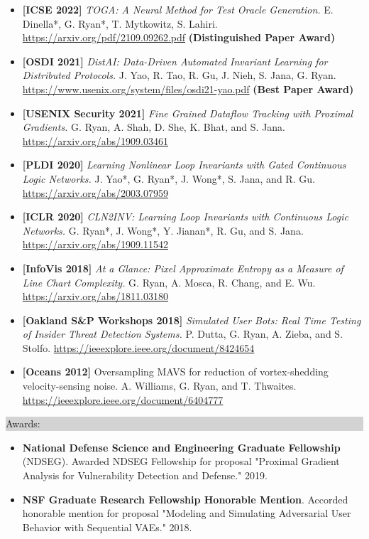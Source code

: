 \documentclass{article} %
\newcommand{\rsection}[1]{
  \hspace{-0.4cm}\vspace{0.1cm}
\colorbox{lightgrey}{
\begin{minipage}{1.07\linewidth}
\vspace{0.22cm}
\fontsize{14pt}{16pt}\selectfont #1
\vspace{0.12cm}
\end{minipage}
}
\vspace*{-0.1cm}
}
\begin{document}
\begin{minipage}{1.01\linewidth}
\begin{itemize}[label={},itemindent=-2em,leftmargin=2em, parsep=5pt]
  \item {\bf [ICSE 2022]}
    \textit{TOGA: A Neural Method for Test Oracle Generation.}
    E. Dinella*, G. Ryan*, T. Mytkowitz, S. Lahiri. \url{https://arxiv.org/pdf/2109.09262.pdf} \textbf{(Distinguished Paper Award)}
  \item {\bf [OSDI 2021]}
    \textit{DistAI: Data-Driven Automated Invariant Learning for Distributed Protocols.}
    J. Yao, R. Tao, R. Gu, J. Nieh, S. Jana, G. Ryan. \url{https://www.usenix.org/system/files/osdi21-yao.pdf} \textbf{(Best Paper Award)}
  \item {\bf [USENIX Security 2021]}
    \textit{Fine Grained Dataflow Tracking with Proximal Gradients.}
    G. Ryan, A. Shah, D. She, K. Bhat, and S. Jana. \url{https://arxiv.org/abs/1909.03461}
  \item {\bf [PLDI 2020]}
    \textit{Learning Nonlinear Loop Invariants with Gated Continuous Logic Networks.}
    J. Yao*, G. Ryan*, J. Wong*, S. Jana, and R. Gu. \url{https://arxiv.org/abs/2003.07959}
  \item {\bf [ICLR 2020]}
    \textit{CLN2INV: Learning Loop Invariants with Continuous Logic Networks.}
    G. Ryan*, J. Wong*, Y. Jianan*, R. Gu, and S. Jana. \url{https://arxiv.org/abs/1909.11542}
  \item {\bf [InfoVis 2018]}
    \textit{At a Glance: Pixel Approximate Entropy as a Measure of Line Chart Complexity.}
    G. Ryan, A. Mosca, R. Chang, and E. Wu. \url{https://arxiv.org/abs/1811.03180}
  \item  {\bf [Oakland S\&P Workshops 2018]}
    \textit{Simulated User Bots: Real Time Testing of Insider Threat Detection Systems.}
    P. Dutta, G. Ryan, A. Zieba, and S. Stolfo. \url{https://ieeexplore.ieee.org/document/8424654}
  \item  {\bf [Oceans 2012]} \textrm{\fontsize{11pt}{12pt}\selectfont Oversampling MAVS for reduction of vortex-shedding velocity-sensing noise.} A. Williams, G. Ryan, and T. Thwaites. \url{https://ieeexplore.ieee.org/document/6404777}
\end{itemize}
\end{minipage}


\rsection{Awards:}
\hspace*{-0.1cm}
\begin{minipage}{1.01\linewidth}
\begin{itemize}[label={},itemindent=-2em,leftmargin=2em, parsep=4pt]
  \item {\bf National Defense Science and Engineering Graduate Fellowship} (NDSEG). Awarded NDSEG Fellowship for proposal "Proximal Gradient Analysis for Vulnerability Detection and Defense." 2019.
  \item {\bf NSF Graduate Research Fellowship Honorable Mention}. Accorded honorable mention for proposal "Modeling and Simulating Adversarial User Behavior with Sequential VAEs." 2018.
  \end{itemize}
\end{minipage}
\end{document}
